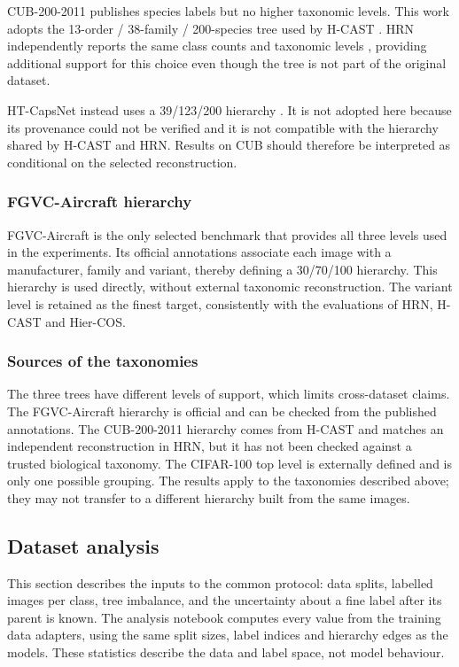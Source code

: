 CUB-200-2011 \cite{wah2011caltech} publishes species labels but no higher
taxonomic levels. This work adopts the 13-order / 38-family / 200-species tree
used by H-CAST \cite{park2024visually}. HRN independently reports the same class
counts and taxonomic levels \cite{chen2022label}, providing additional support
for this choice even though the tree is not part of the original dataset.

HT-CapsNet instead uses a 39/123/200 hierarchy \cite{noor2025taxonomy}. It is not
adopted here because its provenance could not be verified and it is not
compatible with the hierarchy shared by H-CAST and HRN. Results on CUB should
therefore be interpreted as conditional on the selected reconstruction.

\subsubsection{FGVC-Aircraft hierarchy}

FGVC-Aircraft \cite{maji2013fine} is the only selected benchmark that provides
all three levels used in the experiments. Its official annotations associate
each image with a manufacturer, family and variant, thereby defining a
30/70/100 hierarchy. This hierarchy is used directly, without external taxonomic
reconstruction. The variant level is retained as the finest target, consistently
with the evaluations of HRN, H-CAST and Hier-COS.

\subsubsection{Sources of the taxonomies}

The three trees have different levels of support, which limits cross-dataset
claims. The FGVC-Aircraft hierarchy is official and can be checked from the
published annotations. The CUB-200-2011 hierarchy comes from H-CAST and matches
an independent reconstruction in HRN, but it has not been checked against a
trusted biological taxonomy. The CIFAR-100 top level is externally defined and
is only one possible grouping. The results apply to the taxonomies described
above; they may not transfer to a different hierarchy built from the same images.


\subsection{Dataset analysis}
\label{sec:dataset_analysis}

This section describes the inputs to the common protocol: data splits, labelled
images per class, tree imbalance, and the uncertainty about a fine label after
its parent is known. The analysis notebook computes every value
from the training data adapters, using the same split sizes, label indices and
hierarchy edges as the models. These statistics describe the data and label
space, not model behaviour.

